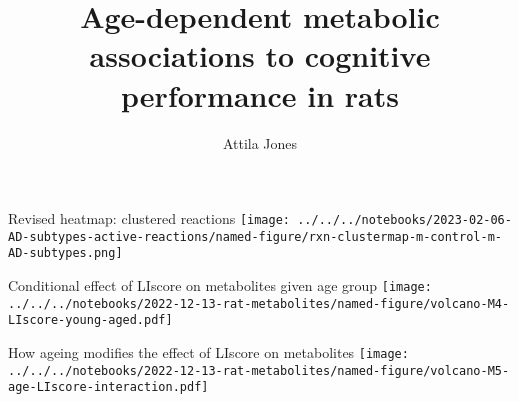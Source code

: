 \documentclass[aspectratio=169]{beamer}
\title{Age-dependent metabolic associations to cognitive performance in rats}
\subtitle{}
\author{Attila Jones}
\date{}
\begin{document}
\begin{frame}{Revised heatmap: clustered reactions} 
\texttt{[image: ../../../notebooks/2023-02-06-AD-subtypes-active-reactions/named-figure/rxn-clustermap-m-control-m-AD-subtypes.png]}
\end{frame}


\titlepage


\begin{frame}{Conditional effect of LIscore on metabolites given age group} 
\texttt{[image: ../../../notebooks/2022-12-13-rat-metabolites/named-figure/volcano-M4-LIscore-young-aged.pdf]}
\end{frame}


\begin{frame}{How ageing modifies the effect of LIscore on metabolites} 
\texttt{[image: ../../../notebooks/2022-12-13-rat-metabolites/named-figure/volcano-M5-age-LIscore-interaction.pdf]}
\end{frame}
\end{document}
